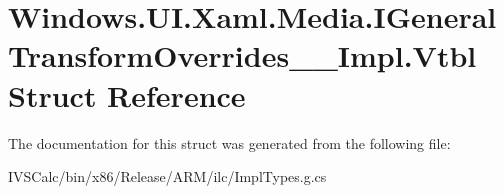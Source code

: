 \hypertarget{struct_windows_1_1_u_i_1_1_xaml_1_1_media_1_1_i_general_transform_overrides_____impl_1_1_vtbl}{}\section{Windows.\+U\+I.\+Xaml.\+Media.\+I\+General\+Transform\+Overrides\+\_\+\+\_\+\+Impl.\+Vtbl Struct Reference}
\label{struct_windows_1_1_u_i_1_1_xaml_1_1_media_1_1_i_general_transform_overrides_____impl_1_1_vtbl}


The documentation for this struct was generated from the following file\+:\begin{DoxyCompactItemize}
\item 
I\+V\+S\+Calc/bin/x86/\+Release/\+A\+R\+M/ilc/Impl\+Types.\+g.\+cs\end{DoxyCompactItemize}
